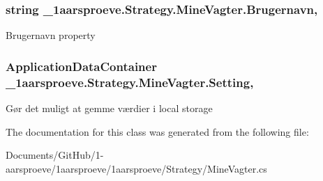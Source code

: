 \subsubsection[{Brugernavn}]{\setlength{\rightskip}{0pt plus 5cm}string \+\_\+1aarsproeve.\+Strategy.\+Mine\+Vagter.\+Brugernavn\hspace{0.3cm}{\ttfamily [get]}, {\ttfamily [set]}}\label{class__1aarsproeve_1_1_strategy_1_1_mine_vagter_a16680d67c3ad258844bb7a9dd043ae5b}


Brugernavn property 

\hypertarget{class__1aarsproeve_1_1_strategy_1_1_mine_vagter_ae23fc5bb662cda6bb70d28f74d8508aa}{}
\subsubsection[{Setting}]{\setlength{\rightskip}{0pt plus 5cm}Application\+Data\+Container \+\_\+1aarsproeve.\+Strategy.\+Mine\+Vagter.\+Setting\hspace{0.3cm}{\ttfamily [get]}, {\ttfamily [set]}}\label{class__1aarsproeve_1_1_strategy_1_1_mine_vagter_ae23fc5bb662cda6bb70d28f74d8508aa}


Gør det muligt at gemme værdier i local storage 



The documentation for this class was generated from the following file\+:\begin{DoxyCompactItemize}
\item 
Documents/\+Git\+Hub/1-\/aarsproeve/1aarsproeve/1aarsproeve/\+Strategy/Mine\+Vagter.\+cs\end{DoxyCompactItemize}
